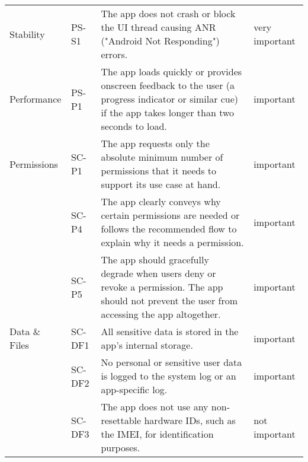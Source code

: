 \begin{longtable}{p{} p{} p{} p{}}
        Stability & PS-S1 & The app does not crash or block the UI thread causing ANR ("Android Not Responding") errors.  & very important\\

        Performance & PS-P1 & The app loads quickly or provides onscreen feedback to the user (a progress indicator or similar cue) if the app takes longer than two seconds to load. & important\\
        
        Permissions & SC-P1 & The app requests only the absolute minimum number of permissions that it needs to support its use case at hand. & important \\
        & SC-P4 & The app clearly conveys why certain permissions are needed or follows the recommended flow to explain why it needs a permission. &  important \\
        & SC-P5 & The app should gracefully degrade when users deny or revoke a permission. The app should not prevent the user from accessing the app altogether. & important\\
        
        Data \& Files & SC-DF1 & All sensitive data is stored in the app's internal storage. & important\\
         & SC-DF2 & No personal or sensitive user data is logged to the system log or an app-specific log. & important\\
         & SC-DF3 & The app does not use any non-resettable hardware IDs, such as the IMEI, for identification purposes. & not important\\

        
        \hline
\end{longtable}

